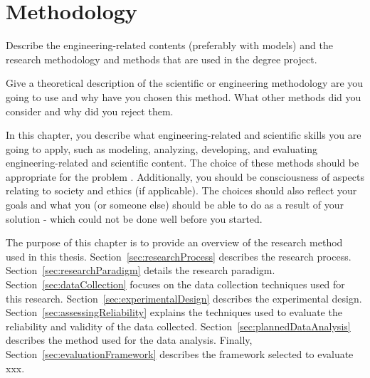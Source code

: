 \documentclass[english]{kththesis}
\begin{document}
\clearpage








































\chapter{Methodology}
\label{ch:methods}

Describe the engineering-related contents (preferably with models) and the research methodology and methods that are used in the degree project. 

Give a theoretical description of the scientific or engineering methodology are you going to use and why have you chosen this method. What other methods did you consider and why did you reject them.

In this chapter, you describe what engineering-related and scientific skills you are going to apply, such as modeling, analyzing, developing, and evaluating engineering-related and scientific content. The choice of these methods should be appropriate for the problem . Additionally, you should be consciousness of aspects relating to society and ethics (if applicable). The choices should also reflect your goals and what you (or someone else) should be able to do as a result of your solution - which could not be done well before you started.

The purpose of this chapter is to provide an overview of the research method
used in this thesis. Section~\ref{sec:researchProcess} describes the research
process. Section~\ref{sec:researchParadigm} details the research
paradigm. Section~\ref{sec:dataCollection} focuses on the data collection
techniques used for this research. Section~\ref{sec:experimentalDesign}
describes the experimental design. Section~\ref{sec:assessingReliability}
explains the techniques used to evaluate the reliability and validity of the
data collected. Section~\ref{sec:plannedDataAnalysis} describes the method
used for the data analysis. Finally, Section~\ref{sec:evaluationFramework}
describes the framework selected to evaluate xxx.
\end{document}
